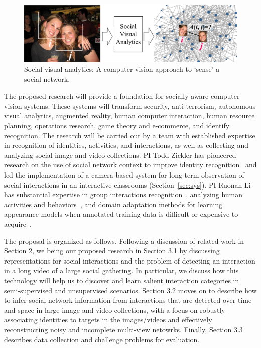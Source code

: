 \begin{figure}[t!]
\begin{center}
\includegraphics[width=\columnwidth]{intro}
\end{center}
\vspace{-0.25in} \caption{\captionsize 
Social visual analytics: A computer vision approach to `sense' a social network. \label{fig:intro}\afterfigspace}
\end{figure}

The proposed research will provide a foundation for socially-aware computer vision systems. These systems will transform security, anti-terrorism, autonomous visual analytics, augmented reality, human computer interaction, human resource planning, operations research, game theory and e-commerce, and identify recognition. The research will be carried out by a team with established expertise in recognition of identities, activities, and interactions, as well as collecting and analyzing social image and video collections. PI Todd Zickler has pioneered research on the use of social network context to improve identity recognition~\cite{Stone2008,Stone2010} and led the implementation of a camera-based system for long-term observation of social interactions in an interactive classrooms (Section~\ref{sec:sys}). PI Ruonan Li has substantial expertise in group interactions recognition~\cite{LiIJCV2012}, analyzing human activities and behaviors~\cite{Li2010,LiPAMI2012}, and domain adaptation methods for learning appearance models when annotated training data is difficult or expensive to acquire~\cite{LiZickler2012,Li2011}. 

The proposal is organized as follows. Following a discussion of related work in Section 2, we being our proposed research in Section 3.1 by discussing representations for social interactions and the problem of detecting an interaction in a long video of a large social gathering. In particular, we discuss how this technology will help us to discover and learn salient interaction categories in semi-supervised and unsupervised scenarios. Section 3.2 moves on to describe how to infer social network information from interactions that are detected over time and space in large image and video collections, with a focus on robustly associating identities to targets in the images/videos and effectively reconstructing noisy and incomplete multi-view netowrks. Finally, Section 3.3 describes data collection and challenge problems for evaluation.




